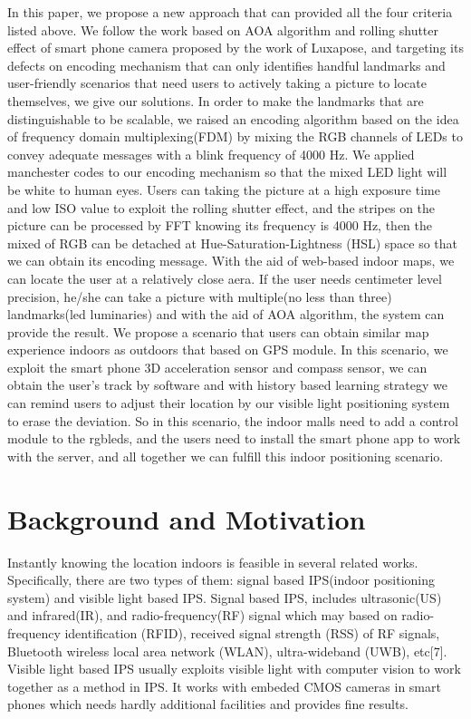 \documentclass[conference]{IEEEtran}
\begin{document}
In this paper, we propose a new approach that can provided all the four criteria listed above. We follow the work based on AOA algorithm and rolling shutter effect of smart phone camera proposed by the work of Luxapose, and targeting its defects on encoding mechanism that can only identifies handful landmarks and user-friendly scenarios that need users to actively taking a picture to locate themselves, we give our solutions. In order to make the landmarks that are distinguishable to be scalable, we raised an encoding algorithm based on the idea of frequency domain multiplexing(FDM) by mixing the RGB channels of LEDs to convey adequate messages with a blink frequency of 4000 Hz. We applied manchester codes to our encoding mechanism so that the mixed LED light will be white to human eyes. Users can taking the picture at a high exposure time and low ISO value to exploit the rolling shutter effect, and the stripes on the picture can be processed by FFT knowing its frequency is 4000 Hz, then the mixed of RGB can be detached at Hue-Saturation-Lightness (HSL) space so that we can obtain its encoding message. With the aid of web-based indoor maps, we can locate the user at a relatively close aera. If the user needs centimeter level precision, he/she can take a picture with multiple(no less than three) landmarks(led luminaries) and with the aid of AOA algorithm, the system can provide the result. We propose a scenario that users can obtain similar map experience indoors as outdoors that based on GPS module. In this scenario, we exploit the smart phone 3D acceleration sensor and compass sensor, we can obtain the user's track by software and with history based learning strategy we can remind users to adjust their location by our visible light positioning system to erase the deviation. So in this scenario, the indoor malls need to add a control module to the rgbleds, and the users need to install the smart phone app to work with the server, and all together we can fulfill this indoor positioning scenario.
	
\section{Background and Motivation}
Instantly knowing the location indoors is feasible in several related works. Specifically, there are two types of them: signal based IPS(indoor positioning system) and visible light based IPS. Signal based IPS, includes ultrasonic(US) and infrared(IR), and radio-frequency(RF) signal which may based on radio-frequency identification (RFID), received signal strength (RSS) of RF signals, Bluetooth wireless local area network (WLAN), ultra-wideband (UWB), etc[7]. Visible light based IPS usually exploits visible light with computer vision to work together as a method in IPS. It works with embeded CMOS cameras in smart phones which needs hardly additional facilities and provides fine results.
	
\end{document}
